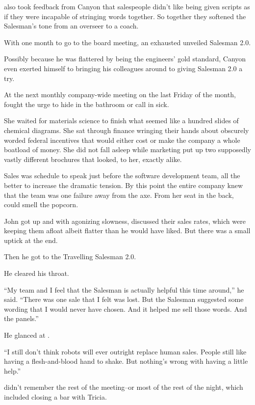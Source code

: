 {\protag} also took feedback from Canyon that salespeople didn't like being given scripts as if they were incapable of stringing words together. So together they softened the Salesman's tone from an overseer to a coach.

With one month to go to the board meeting, an exhausted {\protag} unveiled Salesman 2.0.

Possibly because he was flattered by being the engineers' gold standard, Canyon even exerted himself to bringing his colleagues around to giving Salesman 2.0 a try.

At the next monthly company-wide meeting on the last Friday of the month, {\protag} fought the urge to hide in the bathroom or call in sick.

She waited for materials science to finish what seemed like a hundred slides of chemical diagrams. She sat through finance wringing their hands about obscurely worded federal incentives that would either cost or make the company a whole boatload of money. She did not fall asleep while marketing put up two supposedly vastly different brochures that looked, to her, exactly alike.

Sales was schedule to speak just before the software development team, all the better to increase the dramatic tension. By this point the entire company knew that the team was one failure away from the axe. From her seat in the back, {\protag} could smell the popcorn.

John got up and with agonizing slowness, discussed their sales rates, which were keeping them afloat albeit flatter than he would have liked. But there was a small uptick at the end.

Then he got to the Travelling Salesman 2.0.

He cleared his throat.

``My team and I feel that the Salesman is actually helpful this time around,'' he said. ``There was one sale that I felt was lost. But the Salesman suggested some wording that I would never have chosen. And it helped me sell those words. And the panels.''

He glanced at {\protag}.

``I still don't think robots will ever outright replace human sales. People still like having a flesh-and-blood hand to shake. But nothing's wrong with having a little help.''

{\protag} didn't remember the rest of the meeting--or most of the rest of the night, which included closing a bar with Tricia.

